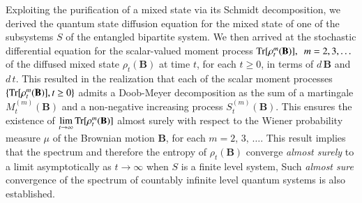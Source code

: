Exploiting the purification of a mixed state via its Schmidt decomposition, we derived the quantum state diffusion equation for the mixed state of one of the subsystems $S$ of the entangled bipartite system. We then arrived at the stochastic differential equation for the scalar-valued moment process ${\rm Tr}[\rho_t^m( \mathbf{B})], \,\,\, m=2,3,\ldots$ of the diffused mixed state $\rho_t(\mathbf{B})$  at time $t$,  for each $t\geq 0$, in terms of $d\,\mathbf{B}$ and $d\,t$. This resulted in the realization that each of the scalar moment processes $\{{\rm Tr}[\rho_t^m( \mathbf{B})], t\geq 0\}$ admits a Doob-Meyer decomposition as the sum of a martingale $M^{(m)}_t(\mathbf{B})$ and a non-negative increasing process $S^{(m)}_t(\mathbf{B})$. This ensures  the existence of $\underset{t\rightarrow\infty}{\lim}\, {\rm Tr}[\rho_t^m( \mathbf{B})]$ almost surely  with respect to the Wiener probability measure $\mu$ of the Brownian motion $\mathbf{B}$, for each $m=2,\, 3,\, \ldots$. This result implies that the spectrum and therefore the entropy of $\rho_t (\mathbf{B})$ converge {\em almost surely} to a  limit asymptotically as $t\rightarrow \infty$ when $S$ is a finite level system, Such {\em almost sure} convergence of the spectrum of countably infinite level quantum systems is also established. 

